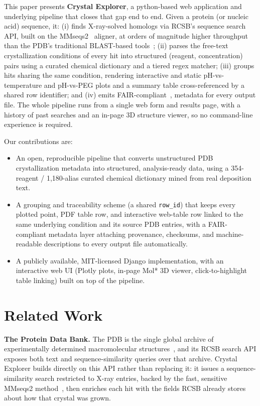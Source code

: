 This paper presents \textbf{Crystal Explorer}, a python-based web application and
underlying pipeline that closes that gap end to end. Given a protein (or nucleic acid) sequence, it: (i) finds X-ray-solved homologs via RCSB's sequence search API, built on the
MMseqs2~\cite{steinegger2017mmseqs2,steinegger2019userguide} aligner,
at orders of magnitude higher throughput than the PDB's traditional
BLAST-based tools~\cite{altschul1990basic,donkor2014bioinformatics};
(ii) parses the free-text crystallization conditions of every hit into
structured (reagent, concentration) pairs using a curated chemical
dictionary and a tiered regex matcher; (iii) groups hits sharing the
same condition, rendering interactive and static pH-vs-temperature and
pH-vs-PEG plots and a summary table cross-referenced by a shared row
identifier; and (iv) emits FAIR-compliant~\cite{wilkinson2016fair},
 metadata for every output file. The whole pipeline runs from
a single web form and results page, with a history of past searches and
an in-page 3D structure viewer, so no command-line experience is
required.

Our contributions are:
\begin{itemize}
  \item An open, reproducible pipeline that converts unstructured PDB
        crystallization metadata into structured, analysis-ready data,
        using a 354-reagent / 1{,}180-alias curated chemical dictionary mined
        from real deposition text.
  \item A grouping and traceability scheme (a shared \texttt{row\_id}) that
        keeps every plotted point, PDF table row, and interactive web-table
        row linked to the same underlying condition and its source PDB
        entries, with a FAIR-compliant metadata layer attaching provenance,
        checksums, and machine-readable descriptions to every output file
        automatically.
  \item A publicly available, MIT-licensed Django implementation, with an
        interactive web UI (Plotly plots, in-page Mol* 3D viewer,
        click-to-highlight table linking) built on top of the pipeline.
\end{itemize}

\section{Related Work}

\textbf{The Protein Data Bank.} The PDB is the single global archive of
experimentally determined macromolecular
structures~\cite{berman2000pdb,burley2021rcsb}, and its RCSB search API
exposes both text and sequence-similarity queries over that archive.
Crystal Explorer builds directly on this API rather than replacing it: it
issues a sequence-similarity search restricted to X-ray entries, backed
by the fast, sensitive MMseqs2 method~\cite{steinegger2017mmseqs2}, then
enriches each hit with the fields RCSB already stores about how that
crystal was grown.

